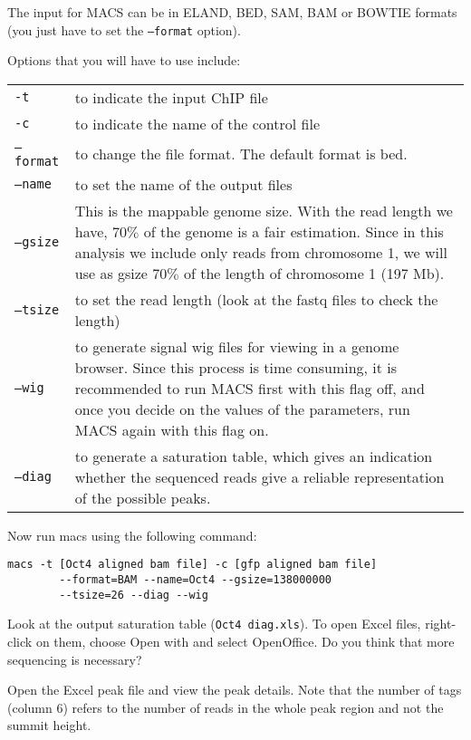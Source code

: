 \begin{information}
The input for MACS can be in ELAND, BED, SAM, BAM or BOWTIE formats (you just
have to set the \texttt{--format} option).

Options that you will have to use include: 


\begin{table}[H]
\centering
\begin{tabular}{>{\raggedleft}p{4cm} p{10.5cm}}
\texttt{-t} & to indicate the input ChIP file \\
\texttt{-c} & to indicate the name of the control file \\
\texttt{--format} & to change the file format. The default format is bed. \\
\texttt{--name} & to set the name of the output files \\
\texttt{--gsize} & This is the mappable genome size. With the read length we have, $70\%$ of the genome is a fair estimation. Since in this analysis we include only reads from chromosome 1, we will use as gsize $70\%$ of the length of chromosome 1 (197 Mb). \\ 
\texttt{--tsize} & to set the read length (look at the fastq files to check the length) \\
\texttt{--wig} & to generate signal wig files for viewing in a genome browser. Since this process is time consuming, it is recommended to run MACS first with this flag off, and once you decide on the values of the parameters, run MACS again with this flag on. \\
\texttt{--diag} & to generate a saturation table, which gives an indication whether the sequenced reads give a reliable representation of the possible peaks. \\
\end{tabular}
\end{table}
\end{information}

\begin{steps}
Now run macs using the following command:

\begin{lstlisting}
macs -t [Oct4 aligned bam file] -c [gfp aligned bam file]  
		--format=BAM --name=Oct4 --gsize=138000000 
		--tsize=26 --diag --wig 
\end{lstlisting}

Look at the output saturation table (\texttt{Oct4 diag.xls}). To open Excel
files, right-click on them, choose Open with and select OpenOffice. Do you think
that more sequencing is necessary?

Open the Excel peak file and view the peak details. Note that the number of tags
(column 6) refers to the number of reads in the whole peak region and not the
summit height.

\end{steps}

